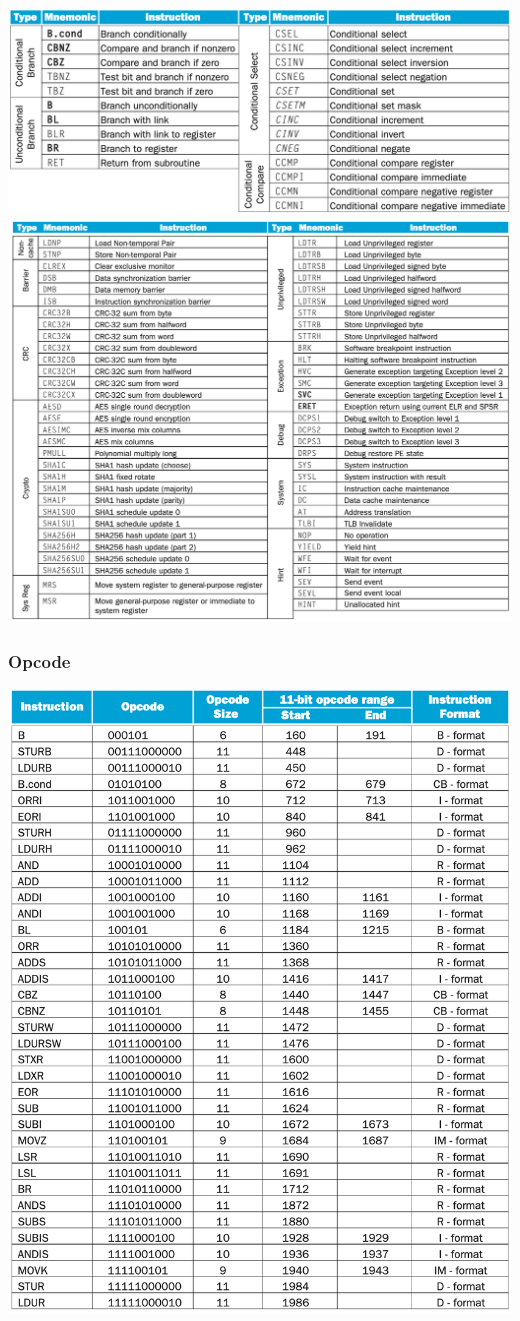 \documentclass[a4paper]{scrartcl}
\begin{document}
        \centering\includegraphics[scale=0.3]{arm_assembler3} 
        \centering\includegraphics[scale=0.26]{arm_assembler4}
        \subsubsection{Opcode}
        \centering\includegraphics[scale=0.26]{opcode.png}
\end{document}
